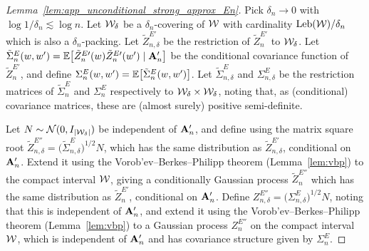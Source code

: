 \begin{proof}[Lemma~\ref{lem:app_unconditional_strong_approx_En}]


  Pick $\delta_n \to 0$
  with $\log 1/\delta_n \lesssim \log n$.
  Let $\mathcal{W}_\delta$ be a $\delta_n$-covering of $\mathcal{W}$
  with cardinality $\operatorname{Leb}(\mathcal{W})/\delta_n$
  which is also a $\delta_n$-packing.
  Let $\tilde Z_{n,\delta}^{E\prime}$
  be the restriction of $\tilde Z_n^{E\prime}$
  to $\mathcal{W}_\delta$.
  Let
  $\tilde \Sigma_n^E(w, w') =
  \mathbb{E}\big[\tilde Z_n^{E\prime}(w) \tilde Z_n^{E\prime}(w')
  \mid \mathbf{A}_n' \big]$
  be the conditional covariance function of $\tilde Z_n^{E\prime}$,
  and define
  $\Sigma_n^E(w,w') = \mathbb{E}\big[\tilde \Sigma_n^E(w,w')\big]$.
  Let $\tilde \Sigma^E_{n,\delta}$
  and $\Sigma^E_{n,\delta}$
  be the restriction matrices of
  $\tilde \Sigma^E_n$
  and $\Sigma^E_n$
  respectively
  to $\mathcal{W}_\delta \times \mathcal{W}_\delta$,
  noting that, as (conditional) covariance matrices,
  these are
  (almost surely)
  positive semi-definite.

  Let $N \sim \mathcal{N}(0, I_{|\mathcal{W}_\delta|})$
  be independent of $\mathbf{A}_n'$,
  and define using the matrix square root
  $\tilde Z_{n,\delta}^{E\dprime}
  = \big(\tilde \Sigma^E_{n,\delta})^{1/2} N$,
  which has the same distribution as
  $\tilde Z_{n,\delta}^{E\prime}$,
  conditional on $\mathbf{A}_n'$.
  Extend it using
  the Vorob'ev--Berkes--Philipp theorem
  (Lemma~\ref{lem:vbp})
  to the compact interval $\mathcal{W}$,
  giving a conditionally Gaussian process
  $\tilde Z_n^{E\dprime}$
  which has the same distribution as
  $\tilde Z_{n}^{E\prime}$,
  conditional on $\mathbf{A}_n'$.
  Define
  $Z_{n,\delta}^{E\dprime} = \big(\Sigma^E_{n,\delta})^{1/2} N$,
  noting that this is independent of $\mathbf{A}_n'$,
  and extend it using
  the Vorob'ev--Berkes--Philipp theorem
  (Lemma~\ref{lem:vbp})
  to a Gaussian process
  $Z_n^{E\dprime}$ on the compact interval $\mathcal{W}$,
  which is independent of $\mathbf{A}_n'$
  and has covariance structure given by
  $\Sigma_n^E$.



\end{proof}
